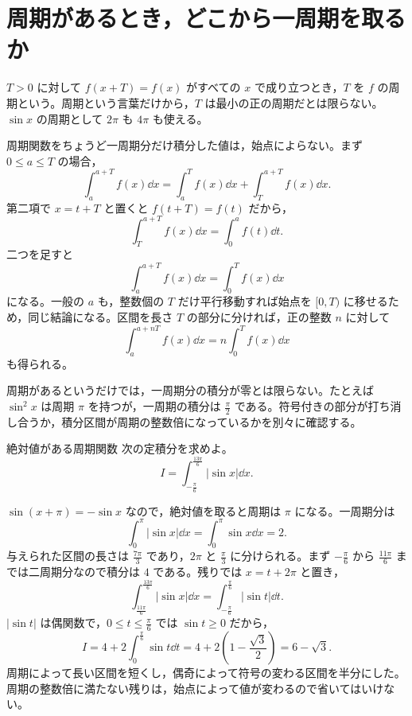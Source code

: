 \section{周期があるとき，どこから一周期を取るか}\label{節:周期関数の積分}

$T>0$ に対して $f(x+T)=f(x)$ がすべての $x$ で成り立つとき，$T$ を $f$ の周期という。周期という言葉だけから，$T$ は最小の正の周期だとは限らない。$\sin x$ の周期として $2\pi$ も $4\pi$ も使える。

周期関数をちょうど一周期分だけ積分した値は，始点によらない。まず $0\leq a\leq T$ の場合，
\[
\int_a^{a+T}f(x)\dd x
 =\int_a^T f(x)\dd x+\int_T^{a+T}f(x)\dd x.
\]
第二項で $x=t+T$ と置くと $f(t+T)=f(t)$ だから，
\[
\int_T^{a+T}f(x)\dd x=\int_0^a f(t)\dd t.
\]
二つを足すと
\begin{equation}\label{式:一周期の積分}
\int_a^{a+T}f(x)\dd x=\int_0^T f(x)\dd x
\end{equation}
になる。一般の $a$ も，整数個の $T$ だけ平行移動すれば始点を $[0,T)$ に移せるため，同じ結論になる。区間を長さ $T$ の部分に分ければ，正の整数 $n$ に対して
\[
\int_a^{a+nT}f(x)\dd x=n\int_0^T f(x)\dd x
\]
も得られる。

周期があるというだけでは，一周期分の積分が零とは限らない。たとえば $\sin^2x$ は周期 $\pi$ を持つが，一周期の積分は $\frac{\pi}{2}$ である。符号付きの部分が打ち消し合うか，積分区間が周期の整数倍になっているかを別々に確認する。

\begin{example}{絶対値がある周期関数}
次の定積分を求めよ。
\[
I=\int_{-\frac{\pi}{6}}^{\frac{13\pi}{6}}|\sin x|\dd x.
\]
\end{example}

$\sin(x+\pi)=-\sin x$ なので，絶対値を取ると周期は $\pi$ になる。一周期分は
\[
\int_0^\pi|\sin x|\dd x=\int_0^\pi\sin x\dd x=2.
\]
与えられた区間の長さは $\frac{7\pi}{3}$ であり，$2\pi$ と $\frac{\pi}{3}$ に分けられる。まず $-\frac{\pi}{6}$ から $\frac{11\pi}{6}$ までは二周期分なので積分は $4$ である。残りでは $x=t+2\pi$ と置き，
\[
\int_{\frac{11\pi}{6}}^{\frac{13\pi}{6}}|\sin x|\dd x
 =\int_{-\frac{\pi}{6}}^{\frac{\pi}{6}}|\sin t|\dd t.
\]
$|\sin t|$ は偶関数で，$0\leq t\leq\frac{\pi}{6}$ では $\sin t\geq0$ だから，
\[
I=4+2\int_0^{\frac{\pi}{6}}\sin t\dd t
 =4+2\left(1-\frac{\sqrt3}{2}\right)
 =6-\sqrt3.
\]
周期によって長い区間を短くし，偶奇によって符号の変わる区間を半分にした。周期の整数倍に満たない残りは，始点によって値が変わるので省いてはいけない。

